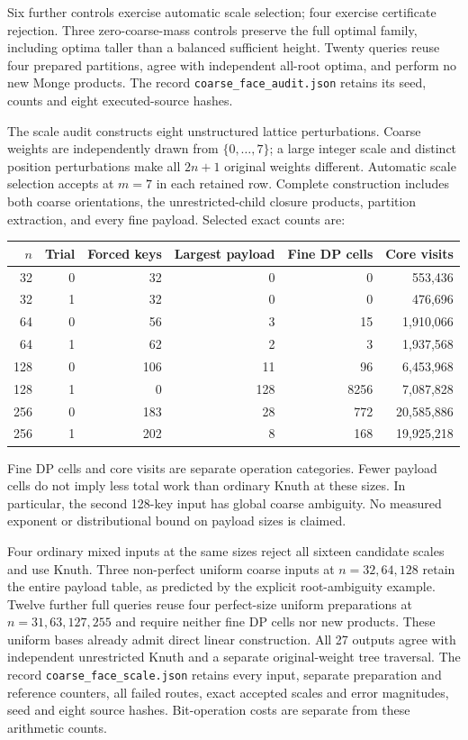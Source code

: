 \documentclass[11pt]{article}
\begin{document}
Six further controls exercise automatic scale selection; four exercise
certificate rejection. Three zero-coarse-mass controls preserve the full
optimal family, including optima taller than a balanced sufficient height.
Twenty queries reuse four prepared partitions, agree with independent
all-root optima, and perform no new Monge products. The record
\texttt{coarse\_face\_audit.json} retains its seed, counts and eight
executed-source hashes.

The scale audit constructs eight unstructured lattice perturbations.
Coarse weights are independently drawn from $\{0,\ldots,7\}$; a large
integer scale and distinct position perturbations make all $2n+1$ original
weights different. Automatic scale selection accepts at $m=7$ in each
retained row. Complete construction includes both coarse orientations,
the unrestricted-child closure products, partition extraction, and every
fine payload. Selected exact counts are:
\begin{center}
\begin{tabular}{rrrrrr}
\toprule
$n$ & Trial & Forced keys & Largest payload & Fine DP cells & Core visits\\
\midrule
32 & 0 & 32 & 0 & 0 & 553,436\\
32 & 1 & 32 & 0 & 0 & 476,696\\
64 & 0 & 56 & 3 & 15 & 1,910,066\\
64 & 1 & 62 & 2 & 3 & 1,937,568\\
128 & 0 & 106 & 11 & 96 & 6,453,968\\
128 & 1 & 0 & 128 & 8256 & 7,087,828\\
256 & 0 & 183 & 28 & 772 & 20,585,886\\
256 & 1 & 202 & 8 & 168 & 19,925,218\\
\bottomrule
\end{tabular}
\end{center}
Fine DP cells and core visits are separate operation categories. Fewer
payload cells do not imply less total work than ordinary Knuth at these
sizes. In particular, the second 128-key input has global coarse ambiguity.
No measured exponent or distributional bound on payload sizes is claimed.

Four ordinary mixed inputs at the same sizes reject all sixteen candidate
scales and use Knuth. Three non-perfect uniform coarse inputs at
$n=32,64,128$ retain the entire payload table, as predicted by the explicit
root-ambiguity example. Twelve further full queries reuse four perfect-size
uniform preparations at $n=31,63,127,255$ and require neither fine DP cells
nor new products. These uniform bases already admit direct linear construction.
All 27 outputs agree with independent unrestricted Knuth and a separate
original-weight tree traversal. The record \texttt{coarse\_face\_scale.json}
retains every input, separate preparation and reference counters, all failed
routes, exact accepted scales and error magnitudes, seed and eight source
hashes. Bit-operation costs are separate from these arithmetic counts.
\end{document}
